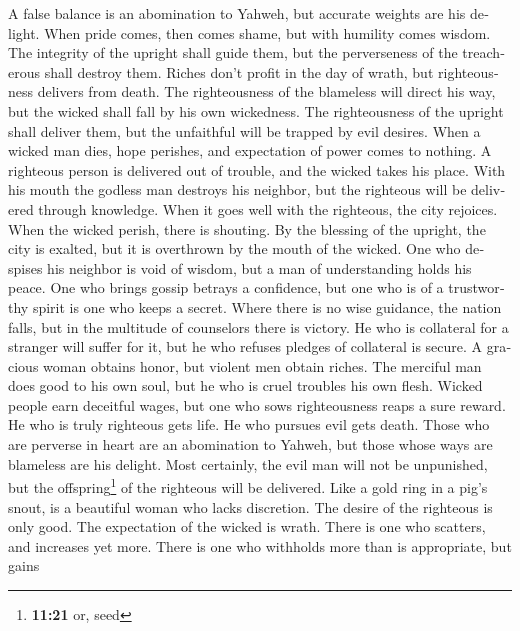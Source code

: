 \begin{paracol}{2}
\begin{otherlanguage}{english}
 A false balance is an abomination to Yahweh, but accurate
weights are his delight.  When pride comes, then comes
shame, but with humility comes wisdom.  The integrity of
the upright shall guide them, but the perverseness of the treacherous
shall destroy them.  Riches don't profit in the day of
wrath, but righteousness delivers from death.  The
righteousness of the blameless will direct his way, but the wicked shall
fall by his own wickedness.  The righteousness of the
upright shall deliver them, but the unfaithful will be trapped by evil
desires.  When a wicked man dies, hope perishes, and
expectation of power comes to nothing.  A righteous person
is delivered out of trouble, and the wicked takes his place.
 With his mouth the godless man destroys his neighbor, but
the righteous will be delivered through knowledge.  When
it goes well with the righteous, the city rejoices. When the wicked
perish, there is shouting.  By the blessing of the
upright, the city is exalted, but it is overthrown by the mouth of the
wicked.  One who despises his neighbor is void of wisdom,
but a man of understanding holds his peace.  One who
brings gossip betrays a confidence, but one who is of a trustworthy
spirit is one who keeps a secret.  Where there is no wise
guidance, the nation falls, but in the multitude of counselors there is
victory.  He who is collateral for a stranger will suffer
for it, but he who refuses pledges of collateral is secure.
 A gracious woman obtains honor, but violent men obtain
riches.  The merciful man does good to his own soul, but
he who is cruel troubles his own flesh.  Wicked people
earn deceitful wages, but one who sows righteousness reaps a sure
reward.  He who is truly righteous gets life. He who
pursues evil gets death.  Those who are perverse in heart
are an abomination to Yahweh, but those whose ways are blameless are his
delight.  Most certainly, the evil man will not be
unpunished, but the offspring\footnote{\textbf{11:21} or, seed} of the
righteous will be delivered.  Like a gold ring in a pig's
snout, is a beautiful woman who lacks discretion.  The
desire of the righteous is only good. The expectation of the wicked is
wrath.  There is one who scatters, and increases yet
more. There is one who withholds more than is appropriate, but gains

\end{otherlanguage}
\end{paracol}
